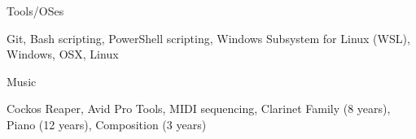 \documentclass[]{awesome-cv}
\begin{document}
	\vspace{-8mm}
	\cventry
	{}
	{Tools/OSes}
	{}
	{}
	{\begin{cvitems}
		\vspace{-7mm}
		\item {Git, Bash scripting, PowerShell scripting, Windows Subsystem for Linux (WSL), Windows, OSX, Linux}
		\end{cvitems}}
	
	\vspace{-8mm}
	\cventry
	{}
	{Music}
	{}
	{}
	{\begin{cvitems}
		\vspace{-7mm}
		\item {Cockos Reaper, Avid Pro Tools, MIDI sequencing, Clarinet Family (8 years), Piano (12 years), Composition (3 years)}
		\end{cvitems}}
	\vspace{-4mm}
\end{document}
